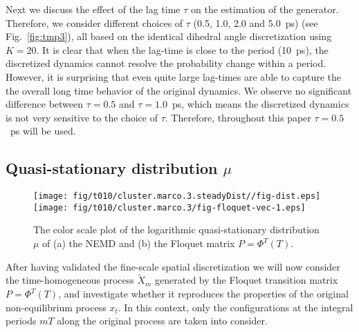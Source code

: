 \documentclass[aps, pre, preprint,unsortedaddress,a4paper,onecolumn]{revtex4}
\newcommand{\vect}[1]{#1}
\newcommand{\myphi}{\Phi}
\newcommand{\mymu}{\mu}
\begin{document}
Next we discuss the effect of the lag time $\tau$ on the estimation of the generator. Therefore, we consider 
different choices of $\tau$ (0.5, 1.0, 2.0 and 5.0~ps)
(see Fig.~\ref{fig:tmp3}), all based on the identical dihedral angle discretization using $K=20$.
It is clear that when the lag-time is close to the period (10~ps), the
discretized dynamics cannot resolve the probability change within a
period. However, it is surprising  that even quite large lag-times are able to capture the
the overall long time behavior of the original dynamics.
We observe no significant difference between $\tau=0.5$ and
$\tau=1.0$~ps, which means the discretized dynamics is not very sensitive
to the choice of $\tau$.
Therefore, throughout this paper $\tau=0.5$~ps will be used.



\subsection{Quasi-stationary distribution $\mymu$}


\begin{figure}
  \centering  
  \texttt{[image: fig/t010/cluster.marco.3.steadyDist//fig-dist.eps]}
  \texttt{[image: fig/t010/cluster.marco.3/fig-floquet-vec-1.eps]}
  \caption{The color scale plot of the logarithmic quasi-stationary distribution $\mymu$
    of (a) the NEMD  and (b)
    the Floquet matrix $\vect P=\myphi^T(T)$.
  }
  \label{fig:num-1}
\end{figure}

After having validated the fine-scale spatial discretization 
we will now consider the time-homogeneous process $\tilde X_{m}$ generated by
the Floquet transition matrix $P = \Phi^T(T)$, and investigate whether it
reproduces the properties of the original  non-equilibrium process $x_t$.
In this context, only the configurations at the  integral periods $mT$ along the original process
are taken into consider.
\end{document}
